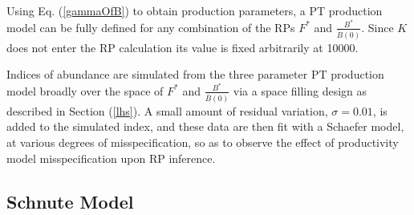 \documentclass[12pt]{article}
\begin{document}
%
Using Eq. (\ref{gammaOfB}) to obtain production parameters, a PT production model 
can be fully defined for any combination of the RPs $F^*$ and $\frac{B^*}{\bar B(0)}$.
Since $K$ does not enter the RP calculation its value is fixed arbitrarily at 10000.

%
%


%

Indices of abundance are simulated from the three parameter PT production model
broadly over the space of $F^*$ and $\frac{B^*}{\bar B(0)}$ via a space filling
design as described in Section (\ref{lhs}). A small amount of residual variation, 
$\sigma=0.01$, is added to the simulated index, and these data are then fit with a
Schaefer model, at various degrees of misspecification, so as to observe the 
effect of productivity model misspecification upon RP inference. 

%
\subsection{Schnute Model}
\end{document}
